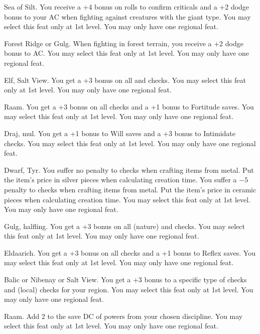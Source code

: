 {}
{Sea of Silt.}
{You receive a +4 bonus on rolls to confirm criticals and a +2 dodge bonus to your AC when fighting against creatures with the giant type.}
{}
{You may select this feat only at 1st level. You may only have one regional feat.}

{}
{Forest Ridge or Gulg.}
{When fighting in forest terrain, you receive a +2 dodge bonus to AC.}
{}
{You may select this feat only at 1st level. You may only have one regional feat.}

{}
{Elf, Salt View.}
{You get a +3 bonus on all  and  checks.}
{}
{You may select this feat only at 1st level. You may only have one regional feat.}

{}
{Raam.}
{You get a +3 bonus on all  checks and a +1 bonus to Fortitude saves.}
{}
{You may select this feat only at 1st level. You may only have one regional feat.}

{}
{Draj, mul.}
{You get a +1 bonus to Will saves and a +3 bonus to Intimidate checks.}
{}
{You may select this feat only at 1st level. You may only have one regional feat.}

{}
{Dwarf, Tyr.}
{You suffer no penalty to  checks when crafting items from metal. Put the item's price in silver pieces when calculating creation time.}
{You suffer a $-5$ penalty to  checks when crafting items from metal. Put the item's price in ceramic pieces when calculating creation time.}
{You may select this feat only at 1st level. You may only have one regional feat.}

{}
{Gulg, halfling.}
{You get a +3 bonus on all  (nature) and  checks.}
{}
{You may select this feat only at 1st level. You may only have one regional feat.}

{}
{Eldaarich.}
{You get a +3 bonus on all  checks and a +1 bonus to Reflex saves.}
{}
{You may select this feat only at 1st level. You may only have one regional feat.}

{}
{Balic or Nibenay or Salt View.}
{You get a +3 bonus to a specific type of  checks and  (local) checks for your region.}
{}
{You may select this feat only at 1st level. You may only have one regional feat.}

{}
{Raam.}
{Add 2 to the save DC of powers from your chosen discipline.}
{}
{You may select this feat only at 1st level. You may only have one regional feat.}